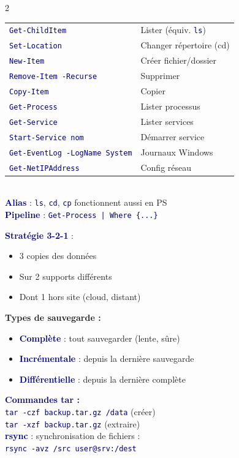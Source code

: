\documentclass[a4paper,10pt]{article}
\newcommand{\key}[1]{\textbf{\textcolor{navy}{#1}}}
\newcommand{\cmd}[1]{\texttt{\textcolor{navy}{#1}}}
\begin{document}
\begin{multicols}{2}
\begin{tcolorbox}[basebox, colframe=teal, title=9. PowerShell — Administration Windows]
\begin{tabular}{ll}
\toprule
\cmd{Get-ChildItem} & Lister (équiv. \cmd{ls}) \\
\cmd{Set-Location} & Changer répertoire (cd) \\
\cmd{New-Item} & Créer fichier/dossier \\
\cmd{Remove-Item -Recurse} & Supprimer \\
\cmd{Copy-Item} & Copier \\
\cmd{Get-Process} & Lister processus \\
\cmd{Get-Service} & Lister services \\
\cmd{Start-Service nom} & Démarrer service \\
\cmd{Get-EventLog -LogName System} & Journaux Windows \\
\cmd{Get-NetIPAddress} & Config réseau \\
\bottomrule
\end{tabular}
\vspace{4pt}\\
\key{Alias} : \cmd{ls}, \cmd{cd}, \cmd{cp} fonctionnent aussi en PS \\
\key{Pipeline} : \cmd{Get-Process | Where \{...\}}
\end{tcolorbox}

\begin{tcolorbox}[basebox, colframe=navy, title=10. Sauvegarde \& Restauration]
\key{Stratégie 3-2-1} :
\begin{itemize}
  \item 3 copies des données
  \item Sur 2 supports différents
  \item Dont 1 hors site (cloud, distant)
\end{itemize}
\vspace{4pt}
\textbf{Types de sauvegarde :}
\begin{itemize}
  \item \key{Complète} : tout sauvegarder (lente, sûre)
  \item \key{Incrémentale} : depuis la dernière sauvegarde
  \item \key{Différentielle} : depuis la dernière complète
\end{itemize}
\vspace{4pt}
\key{Commandes tar :}\\
\cmd{tar -czf backup.tar.gz /data} \quad (créer)\\
\cmd{tar -xzf backup.tar.gz} \quad (extraire)\\[4pt]
\key{rsync} : synchronisation de fichiers :\\
\cmd{rsync -avz /src user@srv:/dest}
\end{tcolorbox}

\end{multicols}
\end{document}
